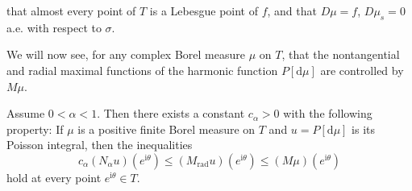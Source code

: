 that almost every point of $T$ is a Lebesgue point of $f$, and that $D\mu=f$, $D\mu_s=0$ a.e. with respect to $\sigma$.\par
We will now see, for any complex Borel measure $\mu$ on $T$, that the nontangential and radial maximal functions of the harmonic function $P[\mathrm{d}\mu]$ are controlled by $M\mu$.
\begin{theorem}
Assume $0<\alpha<1$. Then there exists a constant $c_\alpha>0$ with the following property: If $\mu$ is a positive finite Borel measure on $T$ and $u=P[\mathrm{d}\mu]$ is its Poisson integral, then the inequalities 
$$
c_{\alpha}\left( N_{\alpha}u \right) \left( e^{\mathrm{i}\theta} \right) \le \left( M_{\mathrm{rad}}u \right) \left( e^{\mathrm{i}\theta} \right) \le \left( M\mu \right) \left( e^{\mathrm{i}\theta} \right) 
$$
hold at every point $e^{\mathrm{i}\theta}\in T$.
\end{theorem}
